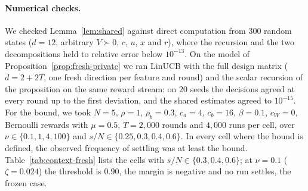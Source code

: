 \documentclass[anon]{alt2027} %
\begin{document}
\paragraph{Numerical checks.}
We checked Lemma~\ref{lem:shared} against direct computation from $300$
random states ($d=12$, arbitrary $V\succ0$, $c$, $u$, $x$ and $r$), where
the recursion and the two decompositions held to relative error below
$10^{-13}$. On the model of Proposition~\ref{prop:fresh-private} we ran
LinUCB with the full design matrix ($d=2+2T$, one fresh direction per
feature and round) and the scalar recursion of the proposition on the same
reward stream: on $20$ seeds the decisions agreed at every round up to the
first deviation, and the shared estimates agreed to $10^{-15}$. For the
bound, we took $N=5$, $\rho=1$, $\rho_b=0.3$, $c_a=4$, $c_b=16$,
$\beta=0.1$, $c_W=0$, Bernoulli rewards with $\mu=0.5$, $T=2{,}000$ rounds
and $4{,}000$ runs per cell, over $\nu\in\{0.1,1,4,100\}$ and
$s/N\in\{0.25,0.3,0.4,0.6\}$. In every cell where the bound is defined, the
observed frequency of settling was at least the bound. Table~\ref{tab:context-fresh} lists the cells
with $s/N\in\{0.3,0.4,0.6\}$; at $\nu=0.1$ ($\zeta=0.024$) the threshold is
$0.90$, the margin is negative and no run settles, the frozen case.
\end{document}
